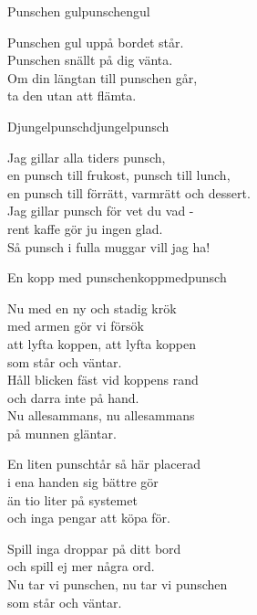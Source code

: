\newpage

\begin{song}{Punschen gul}{punschengul}
\begin{vers}
Punschen gul uppå bordet står.\\
Punschen snällt på dig vänta.\\
Om din längtan till punschen går,\\
ta den utan att flämta.\\
\end{vers}
\end{song}

\begin{song}{Djungelpunsch}{djungelpunsch}
\begin{vers}
Jag gillar alla tiders punsch,\\
en punsch till frukost, punsch till lunch,\\
en punsch till förrätt, varmrätt och dessert.\\
Jag gillar punsch för vet du vad -\\
rent kaffe gör ju ingen glad.\\
Så punsch i fulla muggar vill jag ha!\\
\end{vers}
\end{song}

\newpage

\begin{song}{En kopp med punsch}{enkoppmedpunsch}
\begin{vers}
Nu med en ny och stadig krök\\
med armen gör vi försök\\
att lyfta koppen, att lyfta koppen\\
som står och väntar.\\
Håll blicken fäst vid koppens rand\\
och darra inte på hand.\\
Nu allesammans, nu allesammans\\
på munnen gläntar.\\
\end{vers}
\begin{vers}
En liten punschtår så här placerad\\
i ena handen sig bättre gör\\
än tio liter på systemet\\
och inga pengar att köpa för.\\
\end{vers}
\begin{vers}
Spill inga droppar på ditt bord\\
och spill ej mer några ord.\\
Nu tar vi punschen, nu tar vi punschen\\
som står och väntar.\\
\end{vers}
\end{song}

